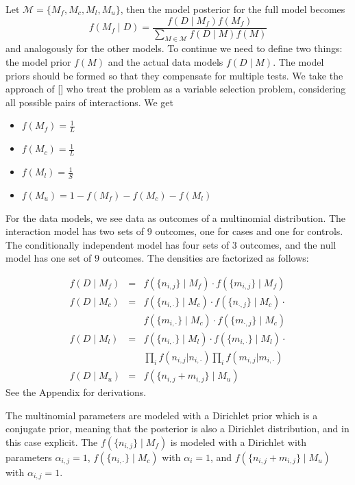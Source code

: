 \documentclass{bioinfo}
\begin{document}
\begin{methods}
Let $\mathcal{M} = \{ M_f, M_c, M_l, M_u \}$, then the model posterior for the full model becomes
$$ f(M_f \mid D) = \frac{f(D \mid M_f)f(M_f)}{\sum_{M \in \mathcal{M}}f(D \mid M)f(M)}$$
and analogously for the other models. To continue we need to define two things: the model prior $f(M)$ and the actual data models $f(D \mid M)$. The model priors should be formed so that they compensate for multiple tests. We take the approach of [] who treat the problem as a variable selection problem, considering all possible pairs of interactions. We get
\begin{itemize}
\item $f(M_f) = \frac{1}{L}$
\item $f(M_c) = \frac{1}{L}$
\item $f(M_l) = \frac{1}{S}$
\item $f(M_u) = 1 - f(M_f) - f(M_c) - f(M_l)$
\end{itemize}
For the data models, we see data as outcomes of a multinomial distribution. The interaction model has two sets of $9$ outcomes, one for cases and one for controls. The conditionally independent model has four sets of $3$ outcomes, and the null model has one set of $9$ outcomes. The densities are factorized as follows:

\begin{eqnarray*}
	f(D \mid M_f)  & = & f( \{ n_{i,j} \} \mid M_f) \cdot f( \{ m_{i,j} \} \mid M_f)\\
	f(D \mid M_c) & = & f( \{ n_{i,\cdot} \} \mid M_c) \cdot f( \{ n_{\cdot, j} \} \mid M_c) \cdot \\
	& & f(\{ m_{i,\cdot} \} \mid M_c) \cdot f( \{ m_{\cdot,j} \} \mid M_c) \\
	f(D \mid M_l)  & = & f( \{ n_{i,\cdot} \} \mid M_l) \cdot f( \{ m_{i,\cdot} \} \mid M_l) \cdot \\
	& & \prod_i f( n_{i,j} | n_{i, \cdot} )  \prod_i f( m_{i,j} | m_{i, \cdot} ) \\
	f(D \mid M_u) & = & f( \{ n_{i,j} + m_{i,j} \} \mid M_u)
\end{eqnarray*}
See the Appendix for derivations.

The multinomial parameters are modeled with a Dirichlet prior which is a conjugate prior, meaning that the posterior is also a Dirichlet distribution, and in this case explicit. The $f( \{ n_{i,j} \} \mid M_f)$ is modeled with a Dirichlet with parameters $\alpha_{i,j}= 1$, $f( \{ n_{i,\cdot} \} \mid M_c)$ with $\alpha_i = 1$, and $f( \{ n_{i,j} + m_{i,j} \} \mid M_u)$ with $\alpha_{i,j} = 1$.


\end{methods}
\end{document}
